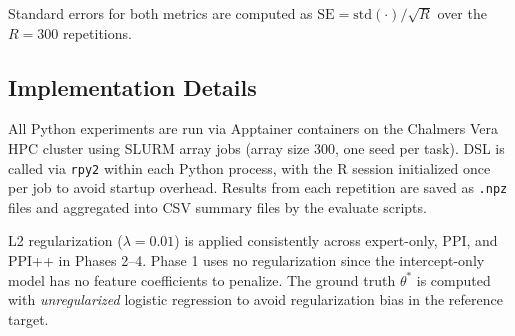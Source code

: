 Standard errors for both metrics are computed as $\text{SE} = \text{std}(\cdot) / \sqrt{R}$ over the $R = 300$ repetitions.

\subsection{Implementation Details}

All Python experiments are run via Apptainer containers on the Chalmers Vera HPC cluster using SLURM array jobs (array size 300, one seed per task). DSL is called via \texttt{rpy2} within each Python process, with the R session initialized once per job to avoid startup overhead. Results from each repetition are saved as \texttt{.npz} files and aggregated into CSV summary files by the evaluate scripts.

L2 regularization ($\lambda = 0.01$) is applied consistently across expert-only, PPI, and PPI++ in Phases 2--4. Phase 1 uses no regularization since the intercept-only model has no feature coefficients to penalize. The ground truth $\theta^*$ is computed with \emph{unregularized} logistic regression to avoid regularization bias in the reference target.
